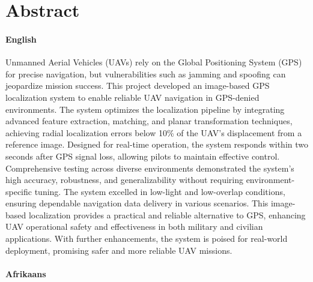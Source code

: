 \chapter*{Abstract}
\makeatletter{}\makeatother

\subsubsection*{English}



Unmanned Aerial Vehicles (UAVs) rely on the Global Positioning System (GPS) for precise navigation, but vulnerabilities such as jamming and spoofing can jeopardize mission success. This project developed an image-based GPS localization system to enable reliable UAV navigation in GPS-denied environments. The system optimizes the localization pipeline by integrating advanced feature extraction, matching, and planar transformation techniques, achieving radial localization errors below 10\% of the UAV's displacement from a reference image. Designed for real-time operation, the system responds within two seconds after GPS signal loss, allowing pilots to maintain effective control. Comprehensive testing across diverse environments demonstrated the system's high accuracy, robustness, and generalizability without requiring environment-specific tuning. The system excelled in low-light and low-overlap conditions, ensuring dependable navigation data delivery in various scenarios. This image-based localization provides a practical and reliable alternative to GPS, enhancing UAV operational safety and effectiveness in both military and civilian applications. With further enhancements, the system is poised for real-world deployment, promising safer and more reliable UAV missions.





\subsubsection*{Afrikaans}



